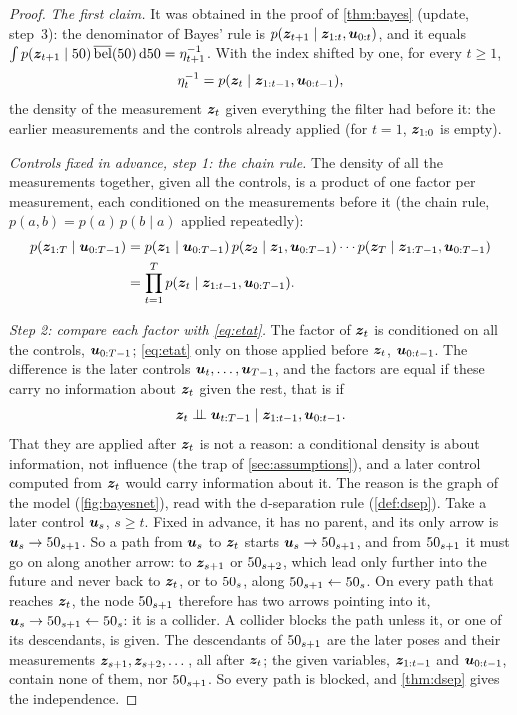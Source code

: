 \begin{proof}
\emph{The first claim.} It was obtained in the proof of \cref{thm:bayes}
(update, step~3): the denominator of Bayes' rule is
$p(\bm{z}_{t+1}\mid\bm{z}_{1:t},\bm{u}_{0:t})$, and it equals
$\int p(\bm{z}_{t+1}\mid50)\,\overline{\operatorname{bel}}(50)\,\mathrm d50=\eta_{t+1}^{-1}$. With
the index shifted by one, for every $t\ge1$,
\begin{equation}\label{eq:etat}
  \eta_t^{-1}=p(\bm{z}_t\mid\bm{z}_{1:t-1},\bm{u}_{0:t-1}),
\end{equation}
the density of the measurement $\bm{z}_t$ given everything the filter had
before it: the earlier measurements and the controls already applied
(for $t=1$, $\bm{z}_{1:0}$ is empty).

\emph{Controls fixed in advance, step 1: the chain rule.} The density of
all the measurements together, given all the controls, is a product of
one factor per measurement, each conditioned on the measurements before
it (the chain rule, $p(a,b)=p(a)\,p(b\mid a)$ applied repeatedly):
\begin{align*}
  p(\bm{z}_{1:T}\mid\bm{u}_{0:T-1})
  &=p(\bm{z}_1\mid\bm{u}_{0:T-1})\,p(\bm{z}_2\mid\bm{z}_1,\bm{u}_{0:T-1})\cdots
   p(\bm{z}_T\mid\bm{z}_{1:T-1},\bm{u}_{0:T-1})\\
  &=\prod_{t=1}^Tp(\bm{z}_t\mid\bm{z}_{1:t-1},\bm{u}_{0:T-1}).
\end{align*}

\emph{Step 2: compare each factor with \eqref{eq:etat}.} The factor of
$\bm{z}_t$ is conditioned on all the controls, $\bm{u}_{0:T-1}$; \eqref{eq:etat}
only on those applied before $\bm{z}_t$, $\bm{u}_{0:t-1}$. The difference is the
later controls $\bm{u}_t,\dots,\bm{u}_{T-1}$, and the factors are equal if
these carry no information about $\bm{z}_t$ given the rest, that is if
\[
  \bm{z}_t\mathrel{\perp\!\!\!\perp}\bm{u}_{t:T-1}\mid\bm{z}_{1:t-1},\bm{u}_{0:t-1}.
\]
That they are applied after $\bm{z}_t$ is not a reason: a conditional density
is about information, not influence (the trap of \cref{sec:assumptions}),
and a later control computed from $\bm{z}_t$ would carry information about
it. The reason is the graph of the model (\cref{fig:bayesnet}), read with
the d-separation rule (\cref{def:dsep}). Take a later control $\bm{u}_s$,
$s\ge t$. Fixed in advance, it has no parent, and its only arrow is
$\bm{u}_s\rightarrow50_{s+1}$. So a path from $\bm{u}_s$ to $\bm{z}_t$ starts
$\bm{u}_s\rightarrow50_{s+1}$, and from $50_{s+1}$ it must go on along
another arrow: to $\bm{z}_{s+1}$ or $50_{s+2}$, which lead only further into
the future and never back to $\bm{z}_t$, or to $50_s$, along
$50_{s+1}\leftarrow50_s$. On every path that reaches $\bm{z}_t$, the node
$50_{s+1}$ therefore has two arrows pointing into it,
$\bm{u}_s\rightarrow50_{s+1}\leftarrow50_s$: it is a collider. A collider
blocks the path unless it, or one of its descendants, is given. The
descendants of $50_{s+1}$ are the later poses and their measurements
$\bm{z}_{s+1},\bm{z}_{s+2},\dots$, all after $\bm{z}_t$; the given variables,
$\bm{z}_{1:t-1}$ and $\bm{u}_{0:t-1}$, contain none of them, nor $50_{s+1}$.
So every path is blocked, and \cref{thm:dsep} gives the independence.


\end{proof}
